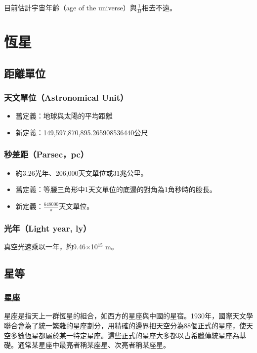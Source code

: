\documentclass[a4paper,12pt]{report}
\begin{document}
目前估計宇宙年齡（age of the universe）與$\frac{1}{H}$相去不遠。
\section{恆星}
\subsection{距離單位}
\subsubsection{天文單位（Astronomical Unit）}
\begin{itemize}
    \item 舊定義：地球與太陽的平均距離
    \item 新定義：149,597,870,895.265908536440公尺
\end{itemize}
\subsubsection{秒差距（Parsec，pc）}
\begin{itemize}
    \item 約3.26光年、206,000天文單位或31兆公里。
    \item 舊定義：等腰三角形中1天文單位的底邊的對角為1角秒時的股長。
    \item 新定義：$\frac{648000}{\pi}$天文單位。
\end{itemize}
\subsubsection{光年（Light year, ly）}
真空光速乘以一年，約9.46$\times$10$^{15}$ m。
\subsection{星等}
\subsubsection{星座}
星座是指天上一群恆星的組合，如西方的星座與中國的星宿。1930年，國際天文學聯合會為了統一繁雜的星座劃分，用精確的邊界把天空分為88個正式的星座，使天空多數恆星都屬於某一特定星座。這些正式的星座大多都以古希臘傳統星座為基礎。通常某星座中最亮者稱某座\text{\textalpha}星、次亮者稱某座\text{\textbeta}星。
\end{document}
